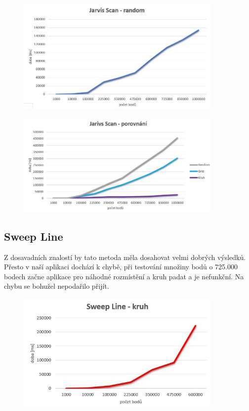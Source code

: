 \documentclass[a4paper, 12pt]{article}
\begin{document}
\begin{figure}[h!]
	\centering
	\includegraphics[width=10cm]{jarvis_random.jpg}
\end{figure}


\begin{figure}[h!]
	\centering
	\includegraphics[width=10cm]{jarvis_vse.jpg}
\end{figure}

\clearpage


\subsection{Sweep Line}
Z dosavadních znalostí by tato metoda měla dosahovat velmi dobrých výsledků. Přesto v naší aplikaci dochází k chybě, při testování množiny bodů o 725.000 bodech začne aplikace pro náhodné rozmístění a kruh padat a je nefunkční. Na chybu se bohužel nepodařilo přijít.

\begin{figure}[h!]
	\centering
	\includegraphics[width=10cm]{sweep_kruh.jpg}
\end{figure}
\end{document}
